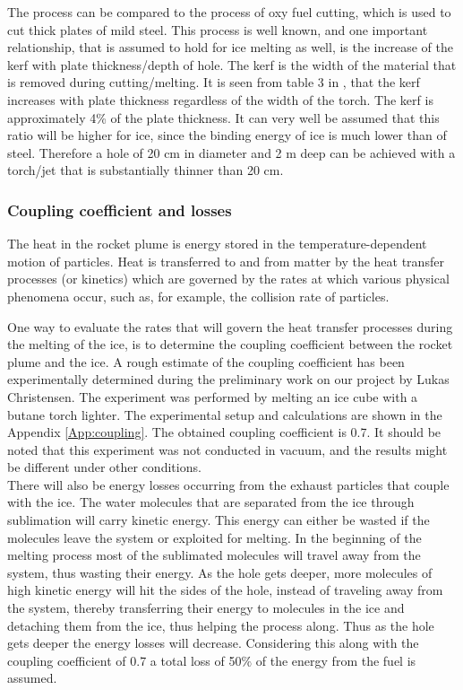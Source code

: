 The process can be compared to the process of oxy fuel cutting, which is used to cut thick plates of mild steel. This process is well known, and one important relationship, that is assumed to hold for ice melting as well, is the increase of the kerf with plate thickness/depth of hole. The kerf is the width of the material that is removed during cutting/melting. It is seen from table 3 in \cite{oxy_fuel}, that the kerf increases with plate thickness regardless of the width of the torch. The kerf is approximately 4\% of the plate thickness. It can very well be assumed that this ratio will be higher for ice, since the binding energy of ice is much lower than of steel. Therefore a hole of 20 cm in diameter and 2 m deep can be achieved  with a torch/jet that is substantially thinner than 20 cm. 

\subsubsection{Coupling coefficient and losses}
The heat in the rocket plume is energy stored in the temperature-dependent motion of particles. Heat is transferred to and from matter by the heat transfer processes (or kinetics) which are governed by the rates at which various physical phenomena occur, such as, for example, the collision rate of particles. 

One way to evaluate the rates that will govern the heat transfer processes during the melting of the ice, is to determine the coupling coefficient between the rocket plume and the ice. A rough estimate of the coupling coefficient has been experimentally determined during the preliminary work on our project by Lukas Christensen. The experiment was performed by melting an ice cube with a butane torch lighter. The experimental setup and calculations are shown in the Appendix \ref{App:coupling}. The obtained coupling coefficient is 0.7. It should be noted that this experiment was not conducted in vacuum, and the results might be different under other conditions. \\

There will also be energy losses occurring from the exhaust particles that couple with the ice. The water molecules that are separated from the ice through sublimation will carry kinetic energy. This energy can either be wasted if the molecules leave the system or exploited for melting. In the beginning of the melting process most of the sublimated molecules will travel away from the system, thus wasting their energy. As the hole gets deeper, more molecules of high kinetic energy will hit the sides of the hole, instead of traveling away from the system, thereby transferring their energy to molecules in the ice and detaching them from the ice, thus helping the process along. Thus as the hole gets deeper the energy losses will decrease. Considering this along with the coupling coefficient of 0.7 a total loss of 50$\%$ of the energy from the fuel is assumed. 


